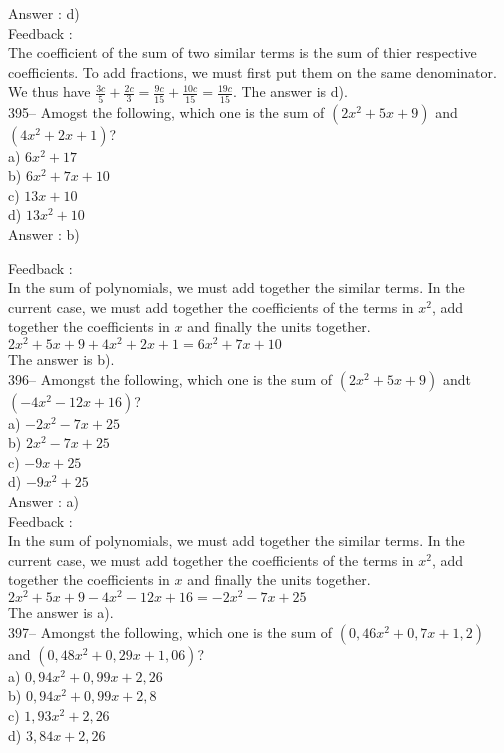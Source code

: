 ﻿\documentclass[letterpaper, 12pt]{article}
\begin{document}
Answer : d)\\

Feedback : \\
The coefficient of the sum of two similar terms is the sum of thier respective coefficients. To add fractions, we must first put them on the same denominator. \\[2mm]
We thus have
$\frac{3c}{5}+\frac{2c}{3}=\frac{9c}{15}+\frac{10c}{15}=\frac{19c}{15}$. The answer is d).\\

395-- Amogst the following, which one is the sum of
$(2x^{2}+5x+9)$ and $(4x^{2}+2x+1)$?\\
a) $6x^{2}+17$\\
b) $6x^{2}+7x+10$\\
c) $13x+10$\\
d) $13x^{2}+10$\\

Answer : b)

Feedback : \\
In the sum of polynomials, we must add together the similar terms. In the current case, we must add together the coefficients of the terms in $x^{2}$, add together the coefficients in $x$ and finally the units together.\\
$2x^{2}+5x+9 + 4x^{2}+2x+1 = 6x^{2}+7x+10$\\
The answer is b).\\

396-- Amongst the following, which one is the sum of
$(2x^{2}+5x+9)$ andt $(-4x^{2}-12x+16)$?\\
a) $-2x^{2}-7x+25$\\
b) $2x^{2}-7x+25$\\
c) $-9x+25$\\
d) $-9x^{2}+25$\\

Answer : a)\\

Feedback : \\
In the sum of polynomials, we must add together the similar terms. In the current case, we must add together the coefficients of the terms in $x^{2}$, add together the coefficients in $x$ and finally the units together.\\
$2x^{2}+5x+9 -4x^{2}-12x+16 = -2x^{2}-7x+25$\\
The answer is a).\\

397-- Amongst the following, which one is the sum of
$(0,46x^{2}+0,7x+1,2)$ and $(0,48x^{2}+0,29x+1,06)$?\\
a) $0,94x^{2}+0,99x+2,26$ \\
b) $0,94x^{2}+0,99x+2,8$ \\
c) $1,93x^{2}+2,26$\\
d) $3,84x+2,26$\\
\end{document}
